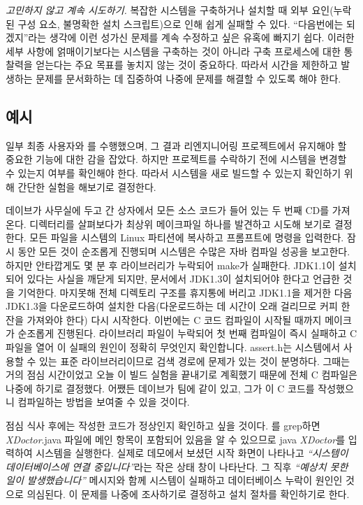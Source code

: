 \documentclass[a4paper,10pt,twoside]{book}
\begin{document}
\begin{bulletlist}
  \item \emph{고민하지 않고 계속 시도하기.}
복잡한 시스템을 구축하거나 설치할 때 외부 요인(누락된 구성 요소, 불명확한 설치 스크립트)으로 인해 쉽게 실패할 수 있다. ``다음번에는 되겠지''라는 생각에 이런 성가신 문제를 계속 수정하고 싶은 유혹에 빠지기 쉽다. 이러한 세부 사항에 얽매이기보다는 시스템을 구축하는 것이 아니라 구축 프로세스에 대한 통찰력을 얻는다는 주요 목표를 놓치지 않는 것이 중요하다. 따라서 시간을 제한하고 발생하는 문제를 문서화하는 데 집중하여 나중에 문제를 해결할 수 있도록 해야 한다.
\end{bulletlist}

\subsection*{예시}

일부 최종 사용자와 를 수행했으며, 그 결과 리엔지니어링 프로젝트에서 유지해야 할 중요한 기능에 대한 감을 잡았다. 하지만 프로젝트를 수락하기 전에 시스템을 변경할 수 있는지 여부를 확인해야 한다. 따라서 시스템을 새로 빌드할 수 있는지 확인하기 위해 간단한 실험을 해보기로 결정한다.

데이브가 사무실에 두고 간 상자에서 모든 소스 코드가 들어 있는 두 번째 CD를 가져온다. 디렉터리를 살펴보다가 최상위 메이크파일 하나를 발견하고 시도해 보기로 결정한다. 모든 파일을 시스템의 Linux 파티션에 복사하고 프롬프트에  명령을 입력한다. 잠시 동안 모든 것이 순조롭게 진행되며 시스템은 수많은 자바 컴파일 성공을 보고한다. 하지만 안타깝게도 몇 분 후  라이브러리가 누락되어 make가 실패한다. JDK1.1이 설치되어 있다는 사실을 깨닫게 되지만, 문서에서 JDK1.3이 설치되어야 한다고 언급한 것을 기억한다. 마지못해 전체 디렉토리 구조를 휴지통에 버리고 JDK1.1을 제거한 다음 JDK1.3을 다운로드하여 설치한 다음(다운로드하는 데 시간이 오래 걸리므로 커피 한 잔을 가져와야 한다) 다시 시작한다. 이번에는 C 코드 컴파일이 시작될 때까지 메이크가 순조롭게 진행된다. 라이브러리 파일이 누락되어 첫 번째 컴파일이 즉시 실패하고 C 파일을 열어 이 실패의 원인이 정확히 무엇인지 확인합니다. assert.h는 시스템에서 사용할 수 있는 표준 라이브러리이므로 검색 경로에 문제가 있는 것이 분명하다. 그때는 거의 점심 시간이었고 오늘 이 빌드 실험을 끝내기로 계획했기 때문에 전체 C 컴파일은 나중에 하기로 결정했다. 어쨌든 데이브가 팀에 같이 있고, 그가 이 C 코드를 작성했으니 컴파일하는 방법을 보여줄 수 있을 것이다.

점심 식사 후에는 작성한 코드가 정상인지 확인하고 싶을 것이다. 를 grep하면 \emph{XDoctor}.java 파일에 메인 항목이 포함되어 있음을 알 수 있으므로 java \emph{XDoctor}를 입력하여 시스템을 실행한다. 실제로 데모에서 보셨던 시작 화면이 나타나고 \emph{``시스템이 데이터베이스에 연결 중입니다''}라는 작은 상태 창이 나타난다. 그 직후 \emph{``예상치 못한 일이 발생했습니다''} 메시지와 함께 시스템이 실패하고 데이터베이스 누락이 원인인 것으로 의심된다. 이 문제를 나중에 조사하기로 결정하고 설치 절차를 확인하기로 한다.
\end{document}
